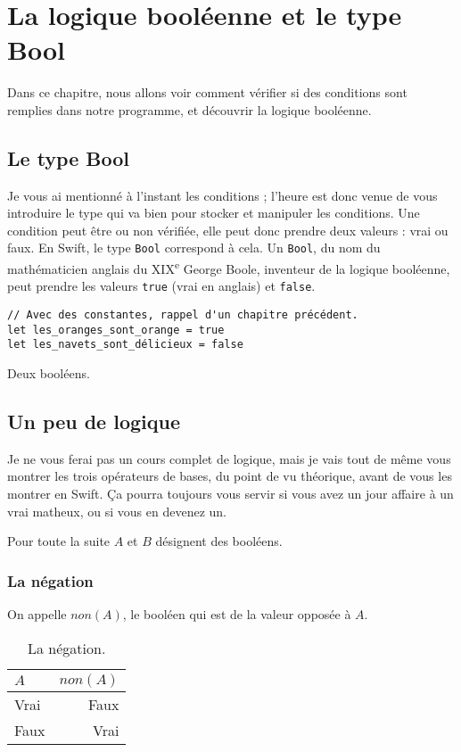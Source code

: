 \chapter{La logique booléenne et le type Bool}
Dans ce chapitre, nous allons voir comment vérifier si des conditions sont remplies dans notre programme, et découvrir la logique booléenne.

\section{Le type Bool}
Je vous ai mentionné à l'instant les conditions ;
l'heure est donc venue de vous introduire le type
\og qui va bien \fg{} pour stocker et manipuler les conditions.
Une condition peut être ou non vérifiée, elle peut donc prendre deux valeurs : \og vrai \fg{} ou \og faux\fg{}.
En Swift, le type \texttt{Bool} correspond à cela. Un \texttt{Bool}, du nom du mathématicien anglais du XIX\textsuperscript{e} George Boole,
inventeur de la logique booléenne, peut prendre les valeurs \texttt{true} (\og vrai \fg{} en anglais) et \texttt{false}.
\begin{listing}
\begin{verbatim}
// Avec des constantes, rappel d'un chapitre précédent.
let les_oranges_sont_orange = true
let les_navets_sont_délicieux = false
\end{verbatim}
\caption{Deux booléens.}
\end{listing}
\section{Un peu de logique}
Je ne vous ferai pas un cours complet de logique, mais je vais tout de même vous montrer les trois opérateurs de bases,
du point de vu théorique, avant de vous les montrer en Swift.
Ça pourra toujours vous servir si vous avez un jour affaire à un vrai matheux, ou si vous en devenez un.


Pour toute la suite $A$ et $B$ désignent des booléens.
\subsection{La négation}
On appelle $non(A)$, le booléen qui est de la valeur opposée à $A$.
\begin{table}[h]
\centering
\begin{tabu} spread \linewidth {|l|r|}
\hline
$A$ & $non(A)$ \\ \hline
Vrai & Faux \\ \hline
Faux & Vrai \\ \hline
\end{tabu}
\caption{La négation.}
\end{table}

